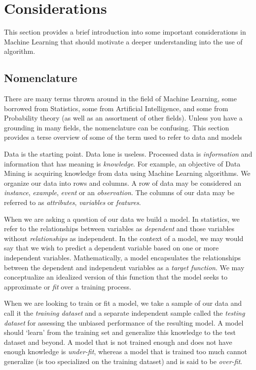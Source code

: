 
\section{Considerations} 
\label{intro:considerations}
This section provides a brief introduction into some important considerations in Machine Learning that should motivate a deeper understanding into the use of algorithm.

\subsection{Nomenclature}
There are many terms thrown around in the field of Machine Learning, some borrowed from Statistics, some from Artificial Intelligence, and some from Probability theory (as well as an assortment of other fields). Unless you have a grounding in many fields, the nomenclature can be confusing. This section provides a terse overview of some of the term used to refer to data and models

Data is the starting point. Data lone is useless. Processed data is \emph{information} and information that has meaning is \emph{knowledge}. For example, an objective of Data Mining is acquiring knowledge from data using Machine Learning algorithms. We organize our data into rows and columns. A row of data may be considered an \emph{instance}, \emph{example}, \emph{event} or an \emph{observation}. The columns of our data may be referred to as \emph{attributes}, \emph{variables} or \emph{features}. 

When we are asking a question of our data we build a model. In statistics, we refer to the relationships between variables as \emph{dependent} and those variables without \emph{relationships} as independent. In the context of a model, we may would say that we wish to predict a dependent variable based on one or more independent variables. Mathematically, a model encapsulates the relationships between the dependent and independent variables as a \emph{target function}. We may conceptualize an idealized version of this function that the model seeks to approximate or \emph{fit} over a training process. 

When we are looking to train or fit a model, we take a sample of our data and call it the \emph{training dataset} and a separate independent sample called the \emph{testing dataset} for assessing the unbiased performance of the resulting model. A model should `learn' from the training set and generalize this knowledge to the test dataset and beyond. A model that is not trained enough and does not have enough knowledge is \emph{under-fit}, whereas a model that is trained too much cannot generalize (is too specialized on the training dataset) and is said to be \emph{over-fit}.

